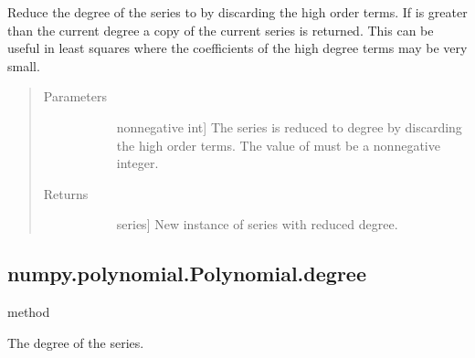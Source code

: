 \documentclass[letterpaper,10pt,english]{sphinxmanual}
\begin{document}
\begin{fulllineitems}
\begin{fulllineitems}
Reduce the degree of the series to  by discarding the
high order terms. If  is greater than the current degree a
copy of the current series is returned. This can be useful in least
squares where the coefficients of the high degree terms may be very
small.

\begin{quote}\begin{description}
\item[{Parameters}] \leavevmode\begin{description}
\item[{}] \leavevmode{[}non\sphinxhyphen{}negative int{]}
The series is reduced to degree  by discarding the high
order terms. The value of  must be a non\sphinxhyphen{}negative integer.

\end{description}

\item[{Returns}] \leavevmode\begin{description}
\item[{}] \leavevmode{[}series{]}
New instance of series with reduced degree.

\end{description}

\end{description}\end{quote}

\end{fulllineitems}



\subsection{numpy.polynomial.Polynomial.degree}
\label{\detokenize{generated/generated/numpy.polynomial.Polynomial.degree:numpy-polynomial-polynomial-degree}}\label{\detokenize{generated/generated/numpy.polynomial.Polynomial.degree::doc}}
method

\begin{fulllineitems}
\label{\detokenize{generated/generated/numpy.polynomial.Polynomial.degree:numpy.polynomial.Polynomial.degree}}
The degree of the series.


\end{fulllineitems}
\end{fulllineitems}
\end{document}
